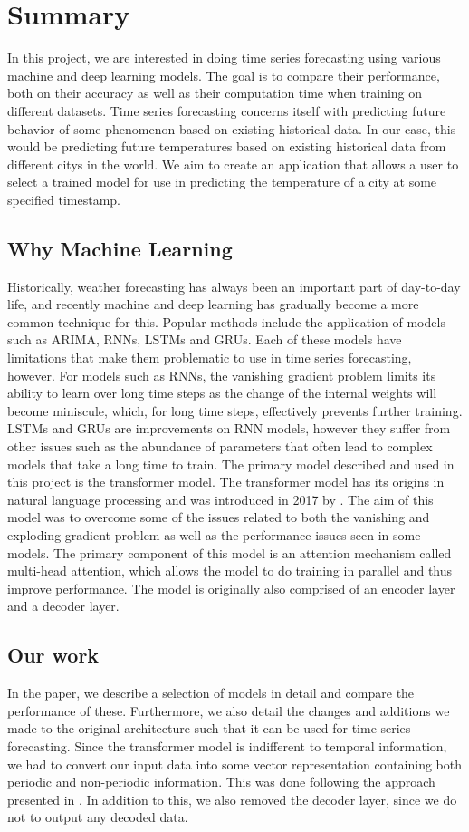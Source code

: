 \section*{Summary}
In this project, we are interested in doing time series forecasting using various machine and deep learning models.
The goal is to compare their performance, both on their accuracy as well as their computation time when training on different datasets.
Time series forecasting concerns itself with predicting future behavior of some phenomenon based on existing historical data.
In our case, this would be predicting future temperatures based on existing historical data from different citys in the world.
We aim to create an application that allows a user to select a trained model for use in predicting the temperature of a  city at some specified timestamp.

\subsection{Why Machine Learning}
Historically, weather forecasting has always been an important part of day-to-day life, and recently machine and deep learning has gradually become a more common technique for this.
Popular methods include the application of models such as ARIMA, RNNs, LSTMs and GRUs.
Each of these models have limitations that make them problematic to use in time series forecasting, however.
For models such as RNNs, the vanishing gradient problem limits its ability to learn over long time steps as the change of the internal weights will become miniscule, which, for long time steps, effectively prevents further training.
LSTMs and GRUs are improvements on RNN models, however they suffer from other issues such as the abundance of parameters that often lead to complex models that take a long time to train.
The primary model described and used in this project is the transformer model.
The transformer model has its origins in natural language processing and was introduced in 2017 by \citet{AttentionIsAllYouNeed}. 
The aim of this model was to overcome some of the issues related to both the vanishing and exploding gradient problem as well as the performance issues seen in some models.
The primary component of this model is an attention mechanism called multi-head attention, which allows the model to do training in parallel and thus improve performance. 
The model is originally also comprised of an encoder layer and a decoder layer. 

\subsection{Our work}
In the paper, we describe a selection of models in detail and compare the performance of these.
Furthermore, we also detail the changes and additions we made to the original architecture such that it can be used for time series forecasting.
Since the transformer model is indifferent to temporal information, we had to convert our input data into some vector representation containing both periodic and non-periodic information.
This was done following the approach presented in \citet{time2vec}.
In addition to this, we also removed the decoder layer, since we do not to output any decoded data.

